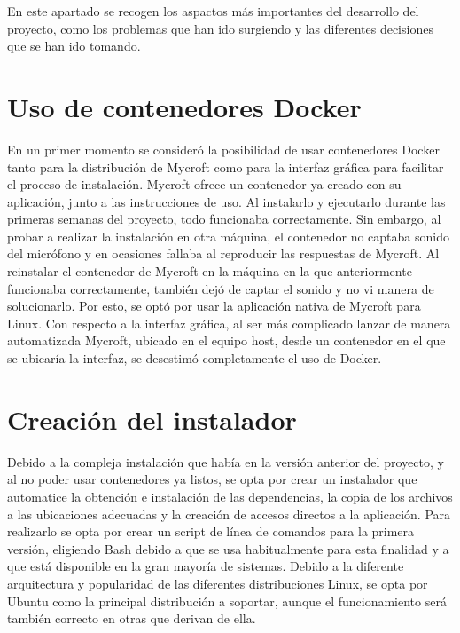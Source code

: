 
En este apartado se recogen los aspactos más importantes del desarrollo del proyecto, como los problemas que han ido surgiendo y las diferentes decisiones que se han ido tomando.

\section{Uso de contenedores Docker}
En un primer momento se consideró la posibilidad de usar contenedores Docker tanto para la distribución de Mycroft como para la interfaz gráfica para facilitar el proceso de instalación.
Mycroft ofrece un contenedor ya creado con su aplicación, junto a las instrucciones de uso. Al instalarlo y ejecutarlo durante las primeras semanas del proyecto, todo funcionaba correctamente. Sin embargo, al probar a realizar la instalación en otra máquina, el contenedor no captaba sonido del micrófono y en ocasiones fallaba al reproducir las respuestas de Mycroft. Al reinstalar el contenedor de Mycroft en la máquina en la que anteriormente funcionaba correctamente, también dejó de captar el sonido y no vi manera de solucionarlo. Por esto, se optó por usar la aplicación nativa de Mycroft para Linux.
Con respecto a la interfaz gráfica, al ser más complicado lanzar de manera automatizada Mycroft, ubicado en el equipo host, desde un contenedor en el que se ubicaría la interfaz, se desestimó completamente el uso de Docker.

\section{Creación del instalador}
Debido a la compleja instalación que había en la versión anterior del proyecto, y al no poder usar contenedores ya listos, se opta por crear un instalador que automatice la obtención e instalación de las dependencias, la copia de los archivos a las ubicaciones adecuadas y la creación de accesos directos a la aplicación. Para realizarlo se opta por crear un script de línea de comandos para la primera versión, eligiendo Bash debido a que se usa habitualmente para esta finalidad y a que está disponible en la gran mayoría de sistemas. Debido a la diferente arquitectura y popularidad de las diferentes distribuciones Linux, se opta por Ubuntu como la principal distribución a soportar, aunque el funcionamiento será también correcto en otras que derivan de ella.

